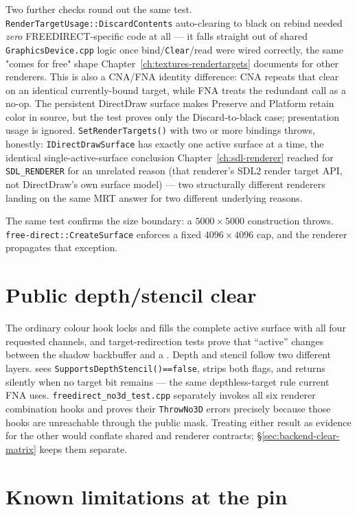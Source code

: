 Two further checks round out the same test. \texttt{RenderTargetUsage::DiscardContents}
auto-clearing to black on rebind needed \emph{zero} FREEDIRECT-specific code at all --- it
falls straight out of shared \texttt{GraphicsDevice.cpp} logic once bind/\texttt{Clear}/read
were wired correctly, the same "comes for free" shape Chapter~\ref{ch:textures-rendertargets}
documents for other renderers. This is also a CNA/FNA identity difference: CNA repeats that
clear on an identical currently-bound target, while FNA treats the redundant call as a no-op.
The persistent DirectDraw surface makes Preserve and Platform retain color in source, but the
test proves only the Discard-to-black case; presentation usage is ignored.
\texttt{SetRenderTargets()} with two or more bindings throws, honestly:
\texttt{IDirectDrawSurface} has exactly one active surface at a time, the identical
single-active-surface conclusion Chapter~\ref{ch:sdl-renderer} reached for
\texttt{SDL\_RENDERER} for an unrelated reason (that renderer's SDL2 render target
API, not DirectDraw's own surface model) --- two structurally different renderers landing on
the same MRT answer for two different underlying reasons.

The same test confirms the size boundary: a $5000 \times 5000$ 
construction throws. \texttt{free-direct::CreateSurface} enforces a fixed
$4096 \times 4096$ cap, and the renderer propagates that exception.

\section{Public depth/stencil clear}

The ordinary colour hook locks and fills the complete active surface with all four requested
channels, and target-redirection tests prove that ``active'' changes between the shadow
backbuffer and a . Depth and stencil follow two different layers.
 sees \texttt{SupportsDepthStencil()==false}, strips both flags, and
returns silently when no target bit remains --- the same depthless-target rule current FNA
uses. \texttt{freedirect\_no3d\_test.cpp} separately invokes all six renderer combination hooks and
proves their \texttt{ThrowNo3D} errors precisely because those hooks are unreachable through
the public mask. Treating either result as evidence for the other would conflate shared and
renderer contracts; \S\ref{sec:backend-clear-matrix} keeps them separate.

\section{Known limitations at the pin}

